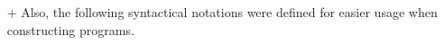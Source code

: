 \begin{itemize}
\begin{itemize}
        \item[+] Also, the following syntactical notations were defined for easier usage when constructing programs.
        \begin{code}
            \>[2]\AgdaSpace{}%
            \AgdaSymbol{:}\AgdaSpace{}%
            \AgdaSymbol{(}\AgdaSpace{}%
            \AgdaSymbol{:}\AgdaSpace{}%
            \AgdaSymbol{)}\AgdaSpace{}%
            \AgdaSpace{}%
            \AgdaSpace{}%
            \AgdaSymbol{(}\AgdaSpace{}%
            \AgdaSymbol{)}\<%
            \\
            \>[2]\AgdaOperator{\AgdaFunction{v[}}\AgdaSpace{}%
            \AgdaSpace{}%
            \AgdaOperator{\AgdaFunction{]}}\AgdaSpace{}%
            \AgdaSymbol{=}\AgdaSpace{}%
            \AgdaSpace{}%
            \<%
            \\
            \\[\AgdaEmptyExtraSkip]%
            \>[2]\AgdaSpace{}%
            \AgdaSpace{}%
            \<%
            \\
            \>[2]\AgdaSpace{}%
            \AgdaSymbol{:}\AgdaSpace{}%
            \AgdaSymbol{\{}\AgdaSpace{}%
            \AgdaSymbol{:}\AgdaSpace{}%
            \AgdaSymbol{\}}\AgdaSpace{}%
            \<%
            \\
            \>[2][@{}l@{\AgdaIndent{0}}]%
            \>[4]\AgdaSpace{}%
            \AgdaSymbol{(}\AgdaSpace{}%
            \AgdaSymbol{)}\AgdaSpace{}%
            \AgdaSpace{}%
            \AgdaSpace{}%
            \AgdaSpace{}%
            \AgdaSpace{}%
            \AgdaSpace{}%
            \<%
            \\
            \>[2]\AgdaSpace{}%
            \AgdaOperator{\AgdaFunction{g[}}\AgdaSpace{}%
            \AgdaSpace{}%
            \AgdaOperator{\AgdaFunction{]}}\AgdaSpace{}%
            \AgdaSymbol{=}\AgdaSpace{}%

\end{code}
\end{itemize}
\end{itemize}
